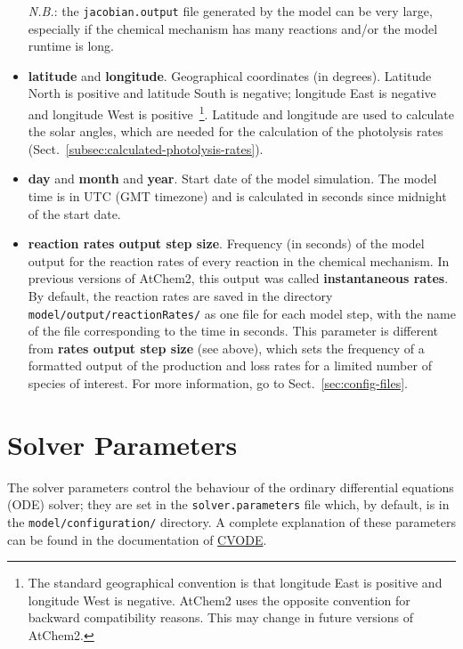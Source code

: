 \begin{itemize}
  \emph{N.B.}: the \texttt{jacobian.output} file generated by the
  model can be very large, especially if the chemical mechanism has
  many reactions and/or the model runtime is long.
\item \textbf{latitude} and \textbf{longitude}. Geographical
  coordinates (in degrees). Latitude North is positive and latitude
  South is negative; longitude East is negative and longitude West is
  positive~\footnote{The standard geographical convention is that
    longitude East is positive and longitude West is negative. AtChem2
    uses the opposite convention for backward compatibility
    reasons. This may change in future versions of AtChem2.}. Latitude
  and longitude are used to calculate the solar angles, which are
  needed for the calculation of the photolysis rates
  (Sect.~\ref{subsec:calculated-photolysis-rates}).
\item \textbf{day} and \textbf{month} and \textbf{year}. Start date of
  the model simulation. The model time is in UTC (GMT timezone) and is
  calculated in seconds since midnight of the start date.
\item \textbf{reaction rates output step size}. Frequency (in seconds)
  of the model output for the reaction rates of every reaction in the
  chemical mechanism. In previous versions of AtChem2, this output was
  called \textbf{instantaneous rates}. By default, the reaction rates
  are saved in the directory \texttt{model/output/reactionRates/} as
  one file for each model step, with the name of the file
  corresponding to the time in seconds. This parameter is different
  from \textbf{rates output step size} (see above), which sets the
  frequency of a formatted output of the production and loss rates for
  a limited number of species of interest. For more information, go to
  Sect.~\ref{sec:config-files}.
\end{itemize}

\section{Solver Parameters} \label{sec:solver-parameters}

The solver parameters control the behaviour of the ordinary
differential equations (ODE) solver; they are set in the
\texttt{solver.parameters} file which, by default, is in the
\texttt{model/configuration/} directory. A complete explanation of
these parameters can be found in the documentation of
\href{https://computing.llnl.gov/projects/sundials/cvode}{CVODE}.


